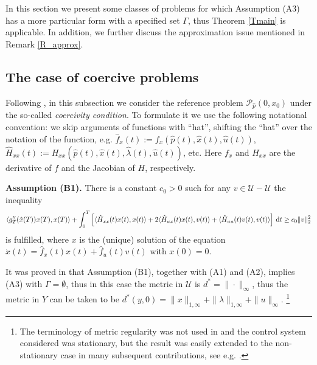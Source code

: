 \documentclass[11pt]{article}
\newcommand{\bd}{\begin{displaymath}}
\newcommand{\ed}{\end{displaymath}}
\newcommand{\U}{\mathcal U}
\newcommand{\dd}{\mbox{\rm\,d}}
\renewcommand{\lll}{\langle}
\newcommand{\rrr}{\rangle}
\newcommand{\p}{{\mathcal P}}
\newcommand{\bino}{\bigskip\noindent}
\begin{document}
In this section we present some classes of problems for which Assumption (A3) has a more particular form
with a specified set $\Gamma$, thus Theorem \ref{Tmain} is applicable. In addition, we further discuss the 
approximation issue mentioned in Remark \ref{R_approx}.

\subsection{The case of coercive problems} \label{SS_coerc} 

Following \cite{DH-93}, in this subsection we consider the reference problem $\p_{\hat p}(0,x_0)$ 
under the so-called {\em coercivity condition}. To formulate it we use the following notational convention:
we skip arguments of functions with ``hat'', shifting the ``hat'' over the notation of the function, e.g.
$\hat f_x(t) := f_x(\hat p(t), \hat x(t), \hat u(t))$, $\hat H_{xx}( t) := H_{xx}(\hat p(t), \hat x(t), \hat \lambda(t),\hat u(t))$, etc.
Here $f_x$ and $H_{xx}$ are the derivative of $f$ and the Jacobian of $H$, respectively.

\bino
{\bf Assumption (B1).} There is a constant $c_0 > 0$ such for any $v \in \U - \U$ the inequality 
\bd
      \langle g_{T}''(\hat x(T))x(T),x(T)\rangle +   \int_0^T \left[ \lll \hat H_{xx}(t) x(t), x(t)  \rrr  + 2 \lll \hat H_{ux}(t) x(t), v(t)  \rrr + \lll \hat H_{uu}(t) v(t), v(t)  \rrr \right] \dd t  
                \geq  c_0 \| v \|_2^2
\ed 
is fulfilled, where $x$ is the (unique) solution of the equation 
$\dot x(t) = \hat f_x(t) x(t) + \hat f_u(t) v(t)$ with $x(0) = 0$.
 
\bino
It was proved in \cite{DH-93} that Assumption (B1), together with (A1) and (A2), implies (A3)
with $\Gamma = \emptyset$, thus in this case the metric in $\U$ is $d^* = \| \cdot \|_\infty$, 
thus the metric in $Y$ can be taken to be $d^*(y,0) = \| x \|_{1,\infty} + \| \lambda \|_{1,\infty} +  \| u \|_{\infty}$.%
\footnote{%
\label{FnDH} The terminology of metric regularity was not used in \cite{DH-93} and the control system considered was 
stationary, but the result was easily extended to the non-stationary case in many subsequent contributions, see e.g.
\cite{Don+Kra+Vel-18}. }
\end{document}
